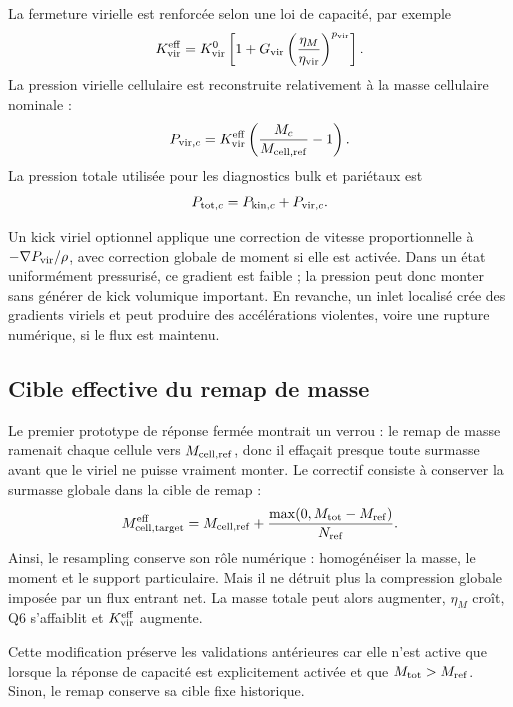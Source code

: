 \documentclass[11pt,a4paper]{article}
\begin{document}
La fermeture virielle est renforcée selon une loi de capacité, par exemple
\begin{equation}
  K_{\rm vir}^{\rm eff}
  = K_{\rm vir}^{0}\left[1+G_{\rm vir}
  \left(\frac{\eta_M}{\eta_{\rm vir}}\right)^{p_{\rm vir}}\right].
\end{equation}
La pression virielle cellulaire est reconstruite relativement à la masse cellulaire nominale :
\begin{equation}
  P_{{\rm vir},c}
  = K_{\rm vir}^{\rm eff}\left(\frac{M_c}{M_{\rm cell,ref}}-1\right).
\end{equation}
La pression totale utilisée pour les diagnostics bulk et pariétaux est
\begin{equation}
  P_{{\rm tot},c}=P_{{\rm kin},c}+P_{{\rm vir},c}.
\end{equation}

Un kick viriel optionnel applique une correction de vitesse proportionnelle à \(-\nabla P_{\rm vir}/\rho\), avec correction globale de moment si elle est activée. Dans un état uniformément pressurisé, ce gradient est faible ; la pression peut donc monter sans générer de kick volumique important. En revanche, un inlet localisé crée des gradients viriels et peut produire des accélérations violentes, voire une rupture numérique, si le flux est maintenu.

\subsection{Cible effective du remap de masse}

Le premier prototype de réponse fermée montrait un verrou : le remap de masse ramenait chaque cellule vers \(M_{\rm cell,ref}\), donc il effaçait presque toute surmasse avant que le viriel ne puisse vraiment monter. Le correctif consiste à conserver la surmasse globale dans la cible de remap :
\begin{equation}
  M_{\rm cell,target}^{\rm eff}
  = M_{\rm cell,ref} + \frac{\max(0,M_{\rm tot}-M_{\rm ref})}{N_{\rm ref}}.
\end{equation}
Ainsi, le resampling conserve son rôle numérique : homogénéiser la masse, le moment et le support particulaire. Mais il ne détruit plus la compression globale imposée par un flux entrant net. La masse totale peut alors augmenter, \(\eta_M\) croît, Q6 s'affaiblit et \(K_{\rm vir}^{\rm eff}\) augmente.

Cette modification préserve les validations antérieures car elle n'est active que lorsque la réponse de capacité est explicitement activée et que \(M_{\rm tot}>M_{\rm ref}\). Sinon, le remap conserve sa cible fixe historique.
\end{document}
